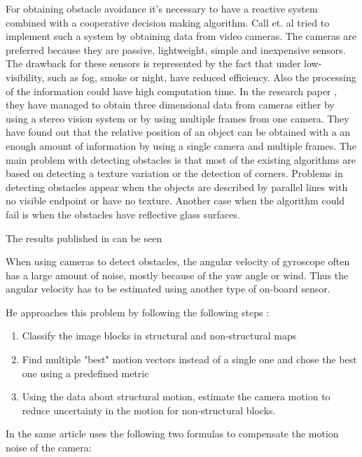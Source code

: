 For obtaining obstacle avoidance it's necessary to have a reactive system combined
with a cooperative decision making algorithm. Call et. al tried to implement
such a system by obtaining data from video cameras. The cameras are preferred
because they are passive,  lightweight,  simple and inexpensive sensors. The
drawback for these sensors is represented by the fact that under low-visibility, 
such as fog, smoke or night, have reduced efficiency. Also the processing of the
information could have high computation time. In the research paper \cite{tracking}, 
they have managed to obtain three dimensional data from cameras either by using
a stereo vision system or by using multiple frames from one camera. They have
found out that the relative position of an object can be obtained with a an
enough amount of information by using a single camera and multiple frames. The 
main problem with detecting obstacles is that most of the existing algorithms 
are based on detecting a texture variation or the detection of corners. Problems
in detecting obstacles appear when the objects are described by parallel lines 
with no visible endpoint or have no texture. Another case when the algorithm could
fail is when the obstacles have reflective glass surfaces.

The results published in \cite{tracking} can be seen 

\newpage

When using cameras to detect obstacles, the angular velocity of gyroscope often
has a large amount of noise, mostly because of the yaw angle or wind. Thus
the angular velocity has to be estimated using another type of on-board sensor. 

He approaches this problem by following the following steps \cite{vision-based}:
\begin{enumerate}
\item Classify the image blocks in structural and non-structural maps
\item Find multiple "best" motion vectors instead of a single one and chose the
best one using a predefined metric
\item Using the data about structural motion, estimate the camera motion to reduce
uncertainty in the motion for non-structural blocks.
\end{enumerate}

In the same article \cite{vision-based} uses the following two formulas to
compensate the motion noise of the camera:


